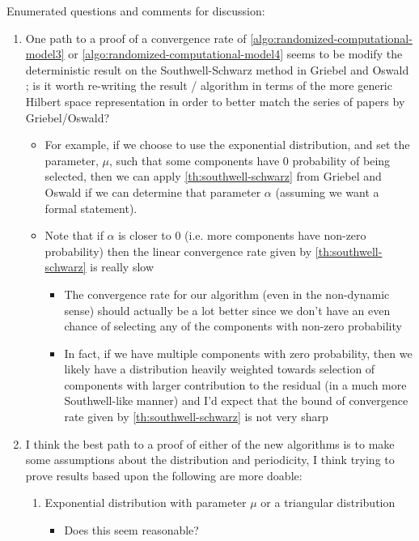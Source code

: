 \documentclass{article}
\theoremstyle{definition}
\theoremstyle{example}
\theoremstyle{example}
\theoremstyle{example}
\begin{document}
Enumerated questions and comments for discussion:

\begin{enumerate}
	\item One path to a proof of a convergence rate of \cref{algo:randomized-computational-model3} or \cref{algo:randomized-computational-model4} seems to be modify the deterministic result on the Southwell-Schwarz method in Griebel and Oswald \cite{griebel2012greedy}; is it worth re-writing the result / algorithm in terms of the more generic Hilbert space representation in order to better match the series of papers by Griebel/Oswald?
		\begin{itemize}
			\item For example, if we choose to use the exponential distribution, and set the parameter, $\mu$, such that some components have 0 probability of being selected, then we can apply \cref{th:southwell-schwarz} from Griebel and Oswald if we can determine that parameter $\alpha$ (assuming we want a formal statement).
			\item Note that if $\alpha$ is closer to 0 (i.e. more components have non-zero probability) then the linear convergence rate given by \cref{th:southwell-schwarz} is really slow
				\begin{itemize}
					\item The convergence rate for our algorithm (even in the non-dynamic sense) should actually be a lot better since we don't have an even chance of selecting any of the components with non-zero probability
					\item In fact, if we have multiple components with zero probability, then we likely have a distribution heavily weighted towards selection of components with larger contribution to the residual (in a much more Southwell-like manner) and I'd expect that the bound of convergence rate given by \cref{th:southwell-schwarz} is not very sharp
				\end{itemize}
		\end{itemize}
	\item I think the best path to a proof of either of the new algorithms is to make some assumptions about the distribution and periodicity, I think trying to prove results based upon the following are more doable:
		\begin{enumerate}
			\item Exponential distribution with parameter $\mu$ or a triangular distribution
				\begin{itemize}
					\item Does this seem reasonable?

\end{itemize}
\end{enumerate}
\end{enumerate}
\end{document}
